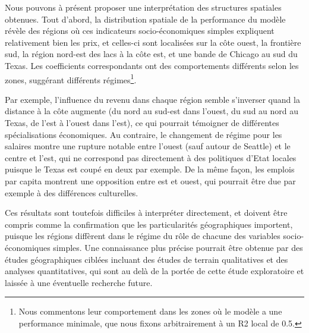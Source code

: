 {Nous pouvons à présent proposer une interprétation des structures spatiales obtenues. Tout d'abord, la distribution spatiale de la performance du modèle révèle des régions où ces indicateurs socio-économiques simples expliquent relativement bien les prix, et celles-ci sont localisées sur la côte ouest, la frontière sud, la région nord-est des lacs à la côte est, et une bande de Chicago au sud du Texas. Les coefficients correspondants ont des comportements différents selon les zones, suggérant différents régimes\footnote{Nous commentons leur comportement dans les zones où le modèle a une performance minimale, que nous fixons arbitrairement à un R2 local de 0.5.}.

Par exemple, l'influence du revenu dans chaque région semble s'inverser quand la distance à la côte augmente (du nord au sud-est dans l'ouest, du sud au nord au Texas, de l'est à l'ouest dans l'est), ce qui pourrait témoigner de différentes spécialisations économiques. Au contraire, le changement de régime pour les salaires montre une rupture notable entre l'ouest (sauf autour de Seattle) et le centre et l'est, qui ne correspond pas directement à des politiques d'Etat locales puisque le Texas est coupé en deux par exemple. De la même façon, les emplois par capita montrent une opposition entre est et ouest, qui pourrait être due par exemple à des différences culturelles.

Ces résultats sont toutefois difficiles à interpréter directement, et doivent être compris comme la confirmation que les particularités géographiques importent, puisque les régions diffèrent dans le régime du rôle de chacune des variables socio-économiques simples. Une connaissance plus précise pourrait être obtenue par des études géographiques ciblées incluant des études de terrain qualitatives et des analyses quantitatives, qui sont au delà de la portée de cette étude exploratoire et laissée à une éventuelle recherche future.
}





